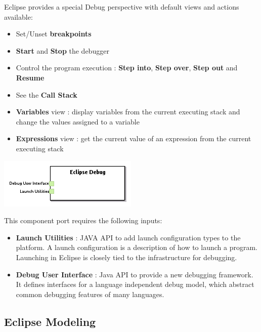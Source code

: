 \documentclass{gemoc} %
\begin{document}
Eclipse provides a special Debug perspective with default views and actions available:
\begin{itemize}
\item Set/Unset \textbf{breakpoints}
\item \textbf{Start} and \textbf{Stop} the debugger
\item Control the program execution : \textbf{Step into}, \textbf{Step over}, \textbf{Step out} and \textbf{Resume}
\item See the \textbf{Call Stack}
\item \textbf{Variables} view : display variables from the current executing stack and change the values assigned to a variable
\item \textbf{Expressions} view : get the current value of an expression from the current executing stack
\end{itemize}
\begin{center}
\includegraphics*[trim=0.0cm 0.0cm 0cm 0.0cm, clip=true]{../images/generated/Generated_Eclipse_Debug.png}
\end{center}

This component port requires the following inputs:
\begin{itemize}
  \item \textbf{Launch Utilities} :
JAVA API to add launch configuration types to the platform. A launch configuration is a description of how to launch a program. Launching in Eclipse is closely tied to the infrastructure for debugging.
  \item \textbf{Debug User Interface} :
Java API to provide a new debugging framework. It defines interfaces for a language independent debug model, which abstract common debugging features of many languages. 
\end{itemize}


\subsection{Eclipse Modeling}
\end{document}
